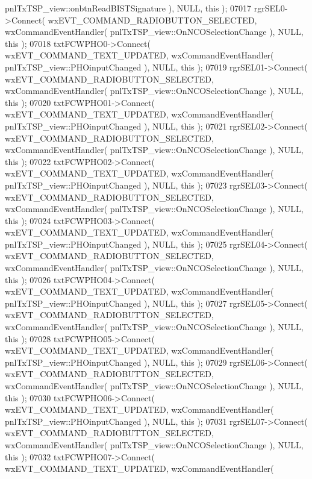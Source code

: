 \begin{DoxyCode}
      pnlTxTSP_view::onbtnReadBISTSignature ), NULL, \textcolor{keyword}{this} );
07017     rgrSEL0->Connect( wxEVT\_COMMAND\_RADIOBUTTON\_SELECTED, wxCommandEventHandler( 
      pnlTxTSP_view::OnNCOSelectionChange ), NULL, \textcolor{keyword}{this} );
07018     txtFCWPHO0->Connect( wxEVT\_COMMAND\_TEXT\_UPDATED, wxCommandEventHandler( 
      pnlTxTSP_view::PHOinputChanged ), NULL, \textcolor{keyword}{this} );
07019     rgrSEL01->Connect( wxEVT\_COMMAND\_RADIOBUTTON\_SELECTED, wxCommandEventHandler( 
      pnlTxTSP_view::OnNCOSelectionChange ), NULL, \textcolor{keyword}{this} );
07020     txtFCWPHO01->Connect( wxEVT\_COMMAND\_TEXT\_UPDATED, wxCommandEventHandler( 
      pnlTxTSP_view::PHOinputChanged ), NULL, \textcolor{keyword}{this} );
07021     rgrSEL02->Connect( wxEVT\_COMMAND\_RADIOBUTTON\_SELECTED, wxCommandEventHandler( 
      pnlTxTSP_view::OnNCOSelectionChange ), NULL, \textcolor{keyword}{this} );
07022     txtFCWPHO02->Connect( wxEVT\_COMMAND\_TEXT\_UPDATED, wxCommandEventHandler( 
      pnlTxTSP_view::PHOinputChanged ), NULL, \textcolor{keyword}{this} );
07023     rgrSEL03->Connect( wxEVT\_COMMAND\_RADIOBUTTON\_SELECTED, wxCommandEventHandler( 
      pnlTxTSP_view::OnNCOSelectionChange ), NULL, \textcolor{keyword}{this} );
07024     txtFCWPHO03->Connect( wxEVT\_COMMAND\_TEXT\_UPDATED, wxCommandEventHandler( 
      pnlTxTSP_view::PHOinputChanged ), NULL, \textcolor{keyword}{this} );
07025     rgrSEL04->Connect( wxEVT\_COMMAND\_RADIOBUTTON\_SELECTED, wxCommandEventHandler( 
      pnlTxTSP_view::OnNCOSelectionChange ), NULL, \textcolor{keyword}{this} );
07026     txtFCWPHO04->Connect( wxEVT\_COMMAND\_TEXT\_UPDATED, wxCommandEventHandler( 
      pnlTxTSP_view::PHOinputChanged ), NULL, \textcolor{keyword}{this} );
07027     rgrSEL05->Connect( wxEVT\_COMMAND\_RADIOBUTTON\_SELECTED, wxCommandEventHandler( 
      pnlTxTSP_view::OnNCOSelectionChange ), NULL, \textcolor{keyword}{this} );
07028     txtFCWPHO05->Connect( wxEVT\_COMMAND\_TEXT\_UPDATED, wxCommandEventHandler( 
      pnlTxTSP_view::PHOinputChanged ), NULL, \textcolor{keyword}{this} );
07029     rgrSEL06->Connect( wxEVT\_COMMAND\_RADIOBUTTON\_SELECTED, wxCommandEventHandler( 
      pnlTxTSP_view::OnNCOSelectionChange ), NULL, \textcolor{keyword}{this} );
07030     txtFCWPHO06->Connect( wxEVT\_COMMAND\_TEXT\_UPDATED, wxCommandEventHandler( 
      pnlTxTSP_view::PHOinputChanged ), NULL, \textcolor{keyword}{this} );
07031     rgrSEL07->Connect( wxEVT\_COMMAND\_RADIOBUTTON\_SELECTED, wxCommandEventHandler( 
      pnlTxTSP_view::OnNCOSelectionChange ), NULL, \textcolor{keyword}{this} );
07032     txtFCWPHO07->Connect( wxEVT\_COMMAND\_TEXT\_UPDATED, wxCommandEventHandler( 

\end{DoxyCode}
